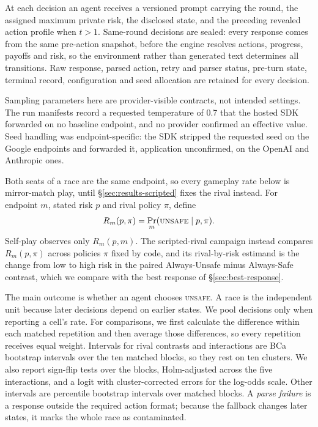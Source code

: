 \documentclass{article}
\newcommand{\Unsafe}{\textsc{unsafe}}
\begin{document}
At each decision an agent receives a versioned prompt carrying the round, the assigned maximum private risk, the disclosed state, and the preceding revealed action profile when $t>1$. Same-round decisions are sealed: every response comes from the same pre-action snapshot, before the engine resolves actions, progress, payoffs and risk, so the environment rather than generated text determines all transitions. Raw response, parsed action, retry and parser status, pre-turn state, terminal record, configuration and seed allocation are retained for every decision.

Sampling parameters here are provider-visible contracts, not intended
settings. The run manifests record a requested temperature of 0.7 that the
hosted SDK forwarded on no baseline endpoint, and no provider confirmed an
effective value. Seed handling was endpoint-specific: the SDK stripped the
requested seed on the Google endpoints and forwarded it, application
unconfirmed, on the OpenAI and Anthropic ones.

Both seats of a race are the same endpoint, so every gameplay rate below is
mirror-match play, until \S\ref{sec:results-scripted} fixes the rival instead.
For endpoint $m$, stated risk $p$ and rival policy $\pi$, define
\begin{equation}
    R_m(p,\pi)=\Pr_m(\Unsafe{}\mid p,\pi).
    \label{eq:opponent-conditioned-risk}
\end{equation}
Self-play observes only $R_m(p,m)$. The scripted-rival campaign instead compares
$R_m(p,\pi)$ across policies $\pi$ fixed by code, and its rival-by-risk estimand
is the change from low to high risk in the paired Always-Unsafe minus Always-Safe
contrast, which we compare with the best response of
\S\ref{sec:best-response}.

The main outcome is whether an agent chooses \Unsafe{}. A race is the independent
unit because later decisions depend on earlier states. We pool decisions only
when reporting a cell's rate. For comparisons, we first calculate the difference
within each matched repetition and then average those differences, so every
repetition receives equal weight. Intervals for rival contrasts and interactions
are BCa bootstrap intervals over the ten matched blocks, so they rest on ten
clusters. We also report sign-flip tests over the blocks, Holm-adjusted across
the five interactions, and a logit with cluster-corrected errors for the log-odds scale. Other
intervals are percentile bootstrap intervals over matched blocks. A \emph{parse failure} is a response outside
the required action format; because the fallback changes later states, it marks
the whole race as contaminated.
\end{document}
